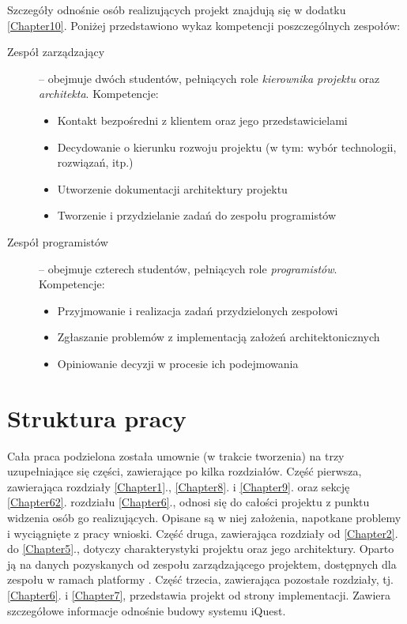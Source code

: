 Szczegóły odnośnie osób realizujących projekt znajdują się w dodatku \ref{Chapter10}. Poniżej przedstawiono wykaz kompetencji poszczególnych zespołów:
\begin{description}
\item[Zespół zarządzający] -- obejmuje dwóch studentów, pełniących role \emph{kierownika projektu} oraz \emph{architekta}. Kompetencje:
\begin{itemize}
\item Kontakt bezpośredni z klientem oraz jego przedstawicielami
\item Decydowanie o kierunku rozwoju projektu (w tym: wybór technologii, rozwiązań, itp.)
\item Utworzenie dokumentacji architektury projektu
\item Tworzenie i przydzielanie zadań do zespołu programistów
\end{itemize}
\item[Zespół programistów] -- obejmuje czterech studentów, pełniących role \emph{programistów}. Kompetencje:
\begin{itemize}
\item Przyjmowanie i realizacja zadań przydzielonych zespołowi
\item Zgłaszanie problemów z implementacją założeń architektonicznych
\item Opiniowanie decyzji w procesie ich podejmowania
\end{itemize}
\end{description}

\section{Struktura pracy}
\label{Chapter15}

Cała praca podzielona została umownie (w trakcie tworzenia) na trzy uzupełniające się części, zawierające po kilka rozdziałów. Część pierwsza, zawierająca rozdziały \ref{Chapter1}., \ref{Chapter8}. i \ref{Chapter9}. oraz sekcję \ref{Chapter62}. rozdziału \ref{Chapter6}., odnosi się do całości projektu z punktu widzenia osób go realizujących. Opisane są w niej założenia, napotkane problemy i wyciągnięte z pracy wnioski. Część druga, zawierająca rozdziały od \ref{Chapter2}. do \ref{Chapter5}., dotyczy charakterystyki projektu oraz jego architektury. Oparto ją na danych pozyskanych od zespołu zarządzającego projektem\cite{Redmine:ProjDocs}, dostępnych dla zespołu w ramach platformy . Część trzecia, zawierająca pozostałe rozdziały, tj. \ref{Chapter6}. i \ref{Chapter7}, przedstawia projekt od strony implementacji. Zawiera szczegółowe informacje odnośnie budowy systemu iQuest.